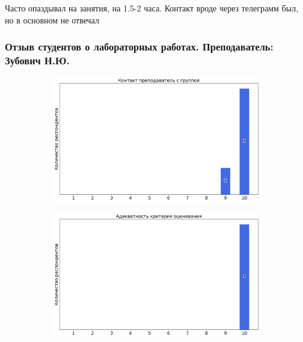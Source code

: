                 \begin{commentbox} 
                    Часто опаздывал на занятия, на 1.5-2 часа. Контакт вроде через телеграмм был, но в основном не отвечал 
                \end{commentbox}

            
            
        \subsubsection{Отзыв студентов о лабораторных работах. Преподаватель: Зубович Н.Ю.}
            \begin{figure}[H]
                \centering
                \begin{subfigure}[b]{0.45\textwidth}
                    \centering
                    \includegraphics[width=\textwidth]{images/3 course/Общая физика - квантовая физика/labniks-marks-Зубович Н.Ю.-0.png}
                \end{subfigure}
                \begin{subfigure}[b]{0.45\textwidth}
                    \centering
                    \includegraphics[width=\textwidth]{images/3 course/Общая физика - квантовая физика/labniks-marks-Зубович Н.Ю.-1.png}

\end{subfigure}
\end{figure}
